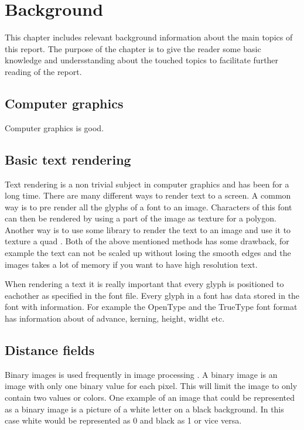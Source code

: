\chapter{Background}\label{cha:theory}
This chapter includes relevant background information about the main topics of this report. The purpose of the chapter is to give the reader some basic knowledge and undersstanding about the touched topics to facilitate further reading of the report.
\section{Computer graphics}\label{computergraphics}
Computer graphics is good. 
\section{Basic text rendering}\label{textrendering}
Text rendering is a non trivial subject in computer graphics and has been for a long time. There are many different ways to render text to a screen. A common way is to pre render all the glyphs of a font to an image. Characters of this font can then be rendered by using a part of the image as texture for a polygon. Another way is to use some library to render the text to an image and use it to texture a quad \citep{FreeType}. Both of the above mentioned methods has some drawback, for example the text can not be scaled up without losing the smooth edges and the images takes a lot of memory if you want to have high resolution text.

When rendering a text it is really important that every glyph is positioned to eachother as specified in the font file. Every glyph in a font has data stored in the font with information. For example the OpenType and the TrueType\texttrademark{} font format has information about of advance, kerning, height, widht etc\citep{OpenType, TrueType}. 
\section{Distance fields}\label{distancefield}
Binary images is used frequently in image processing \citep{Ragnemalm:1993}. A binary image is an image with only one binary value for each pixel. This will limit the image to only contain two values or colors. One example of an image that could be represented as a binary image is a picture of a white letter on a black background. In this case white would be represented as 0 and black as 1 or vice versa.

